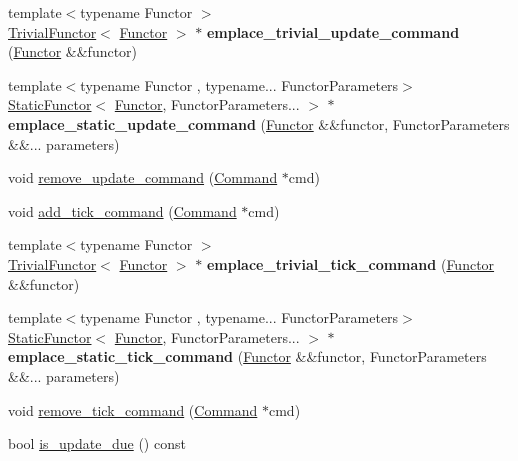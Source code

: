 \begin{DoxyCompactItemize}
\item 
\mbox{\label{class_engine_a999274fb15418af49088371e88687388}} 
{\footnotesize template$<$typename Functor $>$ }\\\mbox{\hyperlink{class_trivial_functor}{Trivial\+Functor}}$<$ \mbox{\hyperlink{class_functor}{Functor}} $>$ $\ast$ {\bfseries emplace\+\_\+trivial\+\_\+update\+\_\+command} (\mbox{\hyperlink{class_functor}{Functor}} \&\&functor)
\item 
\mbox{\label{class_engine_a9d9f6b5fa014f2859d3c75fd2ea1f80d}} 
{\footnotesize template$<$typename Functor , typename... Functor\+Parameters$>$ }\\\mbox{\hyperlink{class_static_functor}{Static\+Functor}}$<$ \mbox{\hyperlink{class_functor}{Functor}}, Functor\+Parameters... $>$ $\ast$ {\bfseries emplace\+\_\+static\+\_\+update\+\_\+command} (\mbox{\hyperlink{class_functor}{Functor}} \&\&functor, Functor\+Parameters \&\&... parameters)
\item 
void \mbox{\hyperlink{class_engine_ad02b6f115de1ce69088c5784cc937d04}{remove\+\_\+update\+\_\+command}} (\mbox{\hyperlink{class_command}{Command}} $\ast$cmd)
\item 
void \mbox{\hyperlink{class_engine_ab2355e889851bc53a6a9e151ca2a1e98}{add\+\_\+tick\+\_\+command}} (\mbox{\hyperlink{class_command}{Command}} $\ast$cmd)
\item 
\mbox{\label{class_engine_aeaa751493222a6a30e80b18d8d8952c3}} 
{\footnotesize template$<$typename Functor $>$ }\\\mbox{\hyperlink{class_trivial_functor}{Trivial\+Functor}}$<$ \mbox{\hyperlink{class_functor}{Functor}} $>$ $\ast$ {\bfseries emplace\+\_\+trivial\+\_\+tick\+\_\+command} (\mbox{\hyperlink{class_functor}{Functor}} \&\&functor)
\item 
\mbox{\label{class_engine_a003d3f0fc5f1109cc485f8f54d8c5d82}} 
{\footnotesize template$<$typename Functor , typename... Functor\+Parameters$>$ }\\\mbox{\hyperlink{class_static_functor}{Static\+Functor}}$<$ \mbox{\hyperlink{class_functor}{Functor}}, Functor\+Parameters... $>$ $\ast$ {\bfseries emplace\+\_\+static\+\_\+tick\+\_\+command} (\mbox{\hyperlink{class_functor}{Functor}} \&\&functor, Functor\+Parameters \&\&... parameters)
\item 
void \mbox{\hyperlink{class_engine_abb354476292180d9db9b4b70d3057096}{remove\+\_\+tick\+\_\+command}} (\mbox{\hyperlink{class_command}{Command}} $\ast$cmd)
\item 
bool \mbox{\hyperlink{class_engine_a6ae98509fe0117b583f9edb6812e3363}{is\+\_\+update\+\_\+due}} () const
\end{DoxyCompactItemize}
